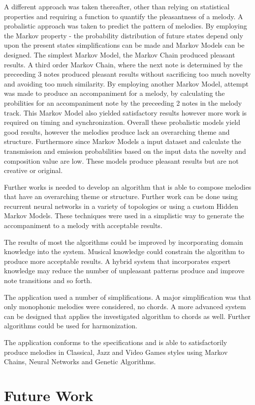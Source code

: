 A different approach was taken thereafter, other than relying on statistical properties and requiring a function to quantify the pleasantness of a melody. A probalistic approach was taken to predict the pattern of melodies. By employing the Markov property - the probability distribution of future states depend only upon the present states simplifications can be made and Markov Models can be designed. The simplest Markov Model, the Markov Chain produced pleasant results. A third order Markov Chain, where the next note is determined by the preceeding 3 notes produced pleasant results without sacrificing too much novelty and avoiding too much similarity. By employing another Markov Model, attempt was made to produce an accompaniment for a melody, by calculating the probilities for an accompaniment note by the preceeding 2 notes in the melody track. This Markov Model also yielded satisfactory results however more work is required on timing and synchronization.
Overall these probalistic models yield good results, however the melodies produce lack an overarching theme and structure. Furthermore since Markov Models a input dataset and calculate the transmission and emission probabilities based on the input data the novelty and composition value are low. These models produce pleasant results but are not creative or original.

Further works is needed to develop an algorithm that is able to compose melodies that have an overarching theme or structure.  Further work can be done using recurrent neural networks in a variety of topologies or using a custom Hidden Markov Models. These techniques were used in a simplistic way to generate the accompaniment to a melody with acceptable results.

The results of most the algorithms could be improved by incorporating domain knowledge into the system. Musical knowledge could constrain the algorithm to produce more acceptable results. A hybrid system that incorporates expert knowledge may reduce the number of unpleasant patterns produce and improve note transitions and so forth.

The application used a number of simplifications. A major simplification was that only monophonic melodies were considered, no chords. A more advanced system can be designed that applies the investigated algorithm to chords as well. Further algorithms could be used for harmonization.

The application conforms to the specifications and is able to satisfactorily produce melodies in Classical, Jazz and Video Games styles using Markov Chains, Neural Networks and Genetic Algorithms.

\chapter{Future Work}